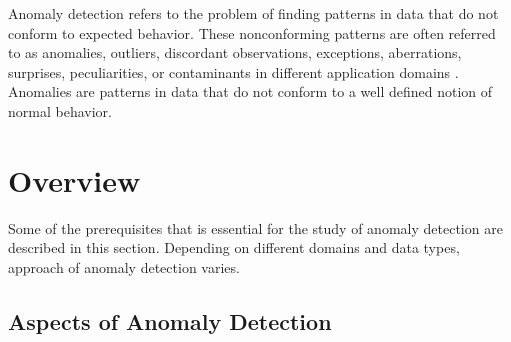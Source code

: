Anomaly detection refers to the problem of finding patterns in data that do not conform
to expected behavior. These nonconforming patterns are often referred to as anomalies,
outliers, discordant observations, exceptions, aberrations, surprises, peculiarities, or contaminants in different application domains \cite{a}. Anomalies are patterns in data that do not conform to a well defined notion of normal
behavior.

\section{Overview}

Some of the prerequisites that is essential for the study of anomaly detection are described in this section. Depending on different domains and data types, approach of anomaly detection varies. 
\subsection{Aspects of Anomaly Detection}

